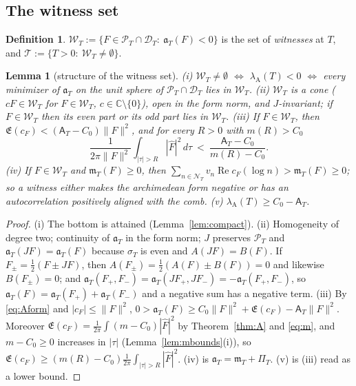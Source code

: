 \documentclass[11pt]{amsart}
\newtheorem{lemma}[theorem]{Lemma}
\theoremstyle{definition}
\newtheorem{definition}[theorem]{Definition}
\theoremstyle{remark}
\newcommand{\C}{\mathbb C}
\newcommand{\Rel}{\operatorname{Re}}
\newcommand{\PT}{\mathcal P_T}
\newcommand{\lamA}{\lambda_{\mathrm A}(T)}
\newcommand{\sT}{\sigma_T}
\newcommand{\Fh}{\widehat F}
\newcommand{\cF}{c_F}
\newcommand{\Lev}{\mathfrak E}
\newcommand{\NT}{\mathcal N_T}
\newcommand{\Aconst}{\mathsf A_T}
\newcommand{\PiT}{\Pi_T}
\newcommand{\mT}{\mathfrak m_T}
\begin{document}
\subsection{The witness set}

\begin{definition}\label{def:wit}
$\mathscr W_T:=\{F\in\PT\cap\mathcal D_T:\ \mathfrak a_T(F)<0\}$ is the set of \emph{witnesses} at $T$, and
$\mathscr T:=\{T>0:\ \mathscr W_T\ne\emptyset\}$.
\end{definition}

\begin{lemma}[structure of the witness set]\label{lem:wit-basic}
\emph{(i)} $\mathscr W_T\ne\emptyset$ $\iff$ $\lamA<0$ $\iff$ every minimizer of $\mathfrak a_T$ on the unit sphere of
$\PT\cap\mathcal D_T$ lies in $\mathscr W_T$.
\emph{(ii)} $\mathscr W_T$ is a cone ($cF\in\mathscr W_T$ for $F\in\mathscr W_T$, $c\in\C\setminus\{0\}$), open in the form norm,
and $J$-invariant; if $F\in\mathscr W_T$ then its even part or its odd part lies in $\mathscr W_T$.
\emph{(iii)} If $F\in\mathscr W_T$, then $\Lev(\cF)<(\Aconst-C_0)\|F\|^2$, and for every $R>0$ with $m(R)>C_0$
\[
\frac1{2\pi\|F\|^2}\int_{|\tau|>R}|\Fh|^2\,d\tau\ <\ \frac{\Aconst-C_0}{m(R)-C_0}.
\]
\emph{(iv)} If $F\in\mathscr W_T$ and $\mT(F)\ge0$, then $\sum_{n\in\NT}v_n\Rel\cF(\log n)>\mT(F)\ge0$; so a witness either
makes the archimedean form negative or has an autocorrelation positively aligned with the comb.
\emph{(v)} $\lamA\ge C_0-\Aconst$.
\end{lemma}

\begin{proof}
(i) The bottom is attained (Lemma~\ref{lem:compact}). (ii) Homogeneity of degree two; continuity of $\mathfrak a_T$
in the form norm; $J$ preserves $\PT$ and $\mathfrak a_T(JF)=\mathfrak a_T(F)$ because $\sT$ is even and $A(JF)=B(F)$. If
$F_\pm=\frac12(F\pm JF)$, then $A(F_\pm)=\frac12(A(F)\pm B(F))=0$ and likewise $B(F_\pm)=0$; and
$\mathfrak a_T(F_+,F_-)=\mathfrak a_T(JF_+,JF_-)=-\mathfrak a_T(F_+,F_-)$, so $\mathfrak a_T(F)=\mathfrak a_T(F_+)+\mathfrak a_T(F_-)$ and a
negative sum has a negative term. (iii) By \eqref{eq:Aform} and $|\cF|\le\|F\|^2$,
$0>\mathfrak a_T(F)\ge C_0\|F\|^2+\Lev(\cF)-\Aconst\|F\|^2$. Moreover
$\Lev(\cF)=\frac1{2\pi}\int(m-C_0)|\Fh|^2$ by Theorem~\ref{thm:A} and \eqref{eq:m}, and $m-C_0\ge0$ increases in
$|\tau|$ (Lemma~\ref{lem:mbounds}(i)), so $\Lev(\cF)\ge(m(R)-C_0)\frac1{2\pi}\int_{|\tau|>R}|\Fh|^2$. (iv) is
$\mathfrak a_T=\mT+\PiT$. (v) is (iii) read as a lower bound.
\end{proof}
\end{document}
